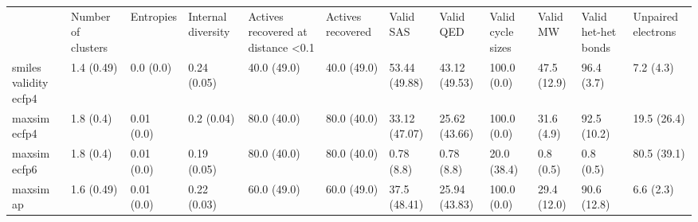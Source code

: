 \begin{tabular}{llllllllllll}
 & Number of clusters & Entropies & Internal diversity & Actives recovered at distance <0.1 & Actives recovered & Valid SAS & Valid QED & Valid cycle sizes & Valid MW & Valid het-het bonds & Unpaired electrons \\
smiles validity ecfp4 & {\cellcolor[HTML]{F5FBFD}} \color[HTML]{000000} 1.4 (0.49) & {\cellcolor[HTML]{F6FCFD}} \color[HTML]{000000} 0.0 (0.0) & {\cellcolor[HTML]{3FAB72}} \color[HTML]{F1F1F1} 0.24 (0.05) & {\cellcolor[HTML]{00441B}} \color[HTML]{F1F1F1} 40.0 (49.0) & {\cellcolor[HTML]{00441B}} \color[HTML]{F1F1F1} 40.0 (49.0) & {\cellcolor[HTML]{5CBD98}} \color[HTML]{F1F1F1} 53.44 (49.88) & {\cellcolor[HTML]{82CEB8}} \color[HTML]{000000} 43.12 (49.53) & {\cellcolor[HTML]{D9F1F0}} \color[HTML]{000000} 100.0 (0.0) & {\cellcolor[HTML]{F7FCFD}} \color[HTML]{000000} 47.5 (12.9) & {\cellcolor[HTML]{47B17E}} \color[HTML]{F1F1F1} 96.4 (3.7) & {\cellcolor[HTML]{4BB382}} \color[HTML]{F1F1F1} 7.2 (4.3) \\
maxsim ecfp4 & {\cellcolor[HTML]{F5FBFC}} \color[HTML]{000000} 1.8 (0.4) & {\cellcolor[HTML]{F6FCFD}} \color[HTML]{000000} 0.01 (0.0) & {\cellcolor[HTML]{53B88C}} \color[HTML]{F1F1F1} 0.2 (0.04) & {\cellcolor[HTML]{00441B}} \color[HTML]{F1F1F1} 80.0 (40.0) & {\cellcolor[HTML]{00441B}} \color[HTML]{F1F1F1} 80.0 (40.0) & {\cellcolor[HTML]{ACDFD4}} \color[HTML]{000000} 33.12 (47.07) & {\cellcolor[HTML]{CAEBE5}} \color[HTML]{000000} 25.62 (43.66) & {\cellcolor[HTML]{E3F4F8}} \color[HTML]{000000} 100.0 (0.0) & {\cellcolor[HTML]{F6FCFD}} \color[HTML]{000000} 31.6 (4.9) & {\cellcolor[HTML]{D4EFEC}} \color[HTML]{000000} 92.5 (10.2) & {\cellcolor[HTML]{39A569}} \color[HTML]{F1F1F1} 19.5 (26.4) \\
maxsim ecfp6 & {\cellcolor[HTML]{F5FBFC}} \color[HTML]{000000} 1.8 (0.4) & {\cellcolor[HTML]{F6FCFD}} \color[HTML]{000000} 0.01 (0.0) & {\cellcolor[HTML]{53B88C}} \color[HTML]{F1F1F1} 0.19 (0.05) & {\cellcolor[HTML]{00441B}} \color[HTML]{F1F1F1} 80.0 (40.0) & {\cellcolor[HTML]{00441B}} \color[HTML]{F1F1F1} 80.0 (40.0) & {\cellcolor[HTML]{F6FCFD}} \color[HTML]{000000} 0.78 (8.8) & {\cellcolor[HTML]{F6FCFD}} \color[HTML]{000000} 0.78 (8.8) & {\cellcolor[HTML]{B7E4DA}} \color[HTML]{000000} 20.0 (38.4) & {\cellcolor[HTML]{F6FCFD}} \color[HTML]{000000} 0.8 (0.5) & {\cellcolor[HTML]{D5EFED}} \color[HTML]{000000} 0.8 (0.5) & {\cellcolor[HTML]{77C9B0}} \color[HTML]{000000} 80.5 (39.1) \\
maxsim ap & {\cellcolor[HTML]{F5FBFC}} \color[HTML]{000000} 1.6 (0.49) & {\cellcolor[HTML]{F6FCFD}} \color[HTML]{000000} 0.01 (0.0) & {\cellcolor[HTML]{3DA96F}} \color[HTML]{F1F1F1} 0.22 (0.03) & {\cellcolor[HTML]{00441B}} \color[HTML]{F1F1F1} 60.0 (49.0) & {\cellcolor[HTML]{00441B}} \color[HTML]{F1F1F1} 60.0 (49.0) & {\cellcolor[HTML]{98D8C9}} \color[HTML]{000000} 37.5 (48.41) & {\cellcolor[HTML]{C8EBE4}} \color[HTML]{000000} 25.94 (43.83) & {\cellcolor[HTML]{8FD4C2}} \color[HTML]{000000} 100.0 (0.0) & {\cellcolor[HTML]{F6FCFD}} \color[HTML]{000000} 29.4 (12.0) & {\cellcolor[HTML]{7CCBB4}} \color[HTML]{000000} 90.6 (12.8) & {\cellcolor[HTML]{7ACBB3}} \color[HTML]{000000} 6.6 (2.3) \\

\end{tabular}
